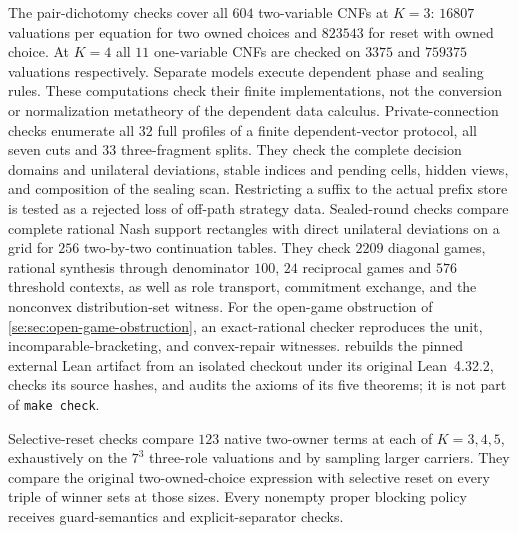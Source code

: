 The pair-dichotomy checks cover all
$604$ two-variable CNFs at $K=3$: $16807$ valuations per equation
for two owned choices and $823543$ for reset with owned choice.
At $K=4$ all $11$ one-variable CNFs are checked on $3375$ and
$759375$ valuations respectively. Separate
models execute dependent phase and sealing rules. These computations
check their finite implementations, not the conversion or normalization
metatheory of the dependent data calculus.
Private-connection checks enumerate all $32$ full profiles of a finite
dependent-vector protocol, all seven cuts and $33$ three-fragment splits.
They check the complete decision domains and unilateral deviations,
stable indices and pending cells, hidden views, and composition of the
sealing scan. Restricting a suffix to the actual prefix store is tested
as a rejected loss of off-path strategy data.
Sealed-round checks compare complete rational Nash support rectangles
with direct unilateral deviations on a grid for $256$ two-by-two
continuation tables. They check $2209$ diagonal games, rational synthesis
through denominator $100$, $24$ reciprocal games and $576$ threshold
contexts, as well as role transport, commitment exchange, and the
nonconvex distribution-set witness.
For the open-game obstruction of \cref{se:sec:open-game-obstruction}, an exact-rational checker reproduces the unit, incomparable-bracketing, and convex-repair witnesses.  rebuilds the pinned external Lean artifact from an isolated checkout under its original Lean~4.32.2, checks its source hashes, and audits the axioms of its five theorems; it is not part of \texttt{make check}.

Selective-reset checks compare $123$ native two-owner terms at each
of $K=3,4,5$, exhaustively on the $7^3$ three-role valuations and by
sampling larger carriers. They compare the original two-owned-choice
expression with selective reset on every triple of winner sets at those
sizes. Every nonempty proper blocking policy receives guard-semantics
and explicit-separator checks.


